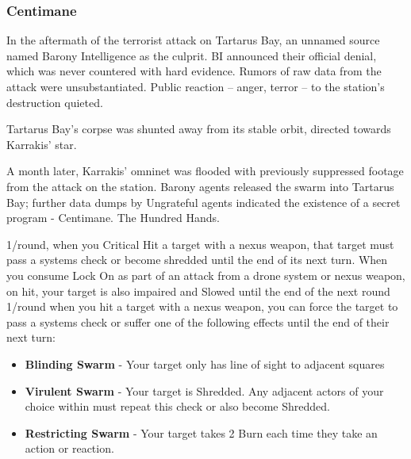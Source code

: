 \subsubsection{Centimane}

\begin{talent}
{In the aftermath of the terrorist attack on Tartarus Bay, an unnamed source named Barony Intelligence as the culprit. BI announced their official denial, which was never countered with hard evidence. Rumors of raw data from the attack were unsubstantiated. Public reaction -- anger, terror -- to the station's destruction quieted.

Tartarus Bay's corpse was shunted away from its stable orbit, directed towards Karrakis' star.

A month later, Karrakis' omninet was flooded with previously suppressed footage from the attack on the station. Barony agents released the swarm into Tartarus Bay; further data dumps by Ungrateful agents indicated the existence of a secret program - Centimane. The Hundred Hands.}

1/round, when you Critical Hit a target with a nexus weapon, that target must pass a systems check or become shredded until the end of its next turn.
When you consume Lock On as part of an attack from a drone system or nexus weapon, on hit, your target is also impaired and Slowed until the end of the next round
1/round when you hit a target with a nexus weapon, you can force the target to pass a systems check or suffer one of the following effects until the end of their next turn: 
\begin{itemize}
\item \textbf{Blinding Swarm} - Your target only has line of sight to adjacent squares 
\item \textbf{Virulent Swarm} - Your target is Shredded. Any adjacent actors of your choice within must repeat this check or also become Shredded. 
\item \textbf{Restricting Swarm} - Your target takes 2 Burn each time they take an action or reaction.
\end{itemize}
\end{talent}